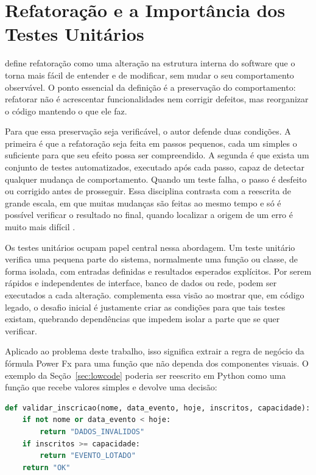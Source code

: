 \section{Refatoração e a Importância dos Testes Unitários}
\label{sec:refatoracao}

 define refatoração como uma alteração na estrutura interna do software que o torna mais fácil de entender e de modificar, sem mudar o seu comportamento observável. O ponto essencial da definição é a preservação do comportamento: refatorar não é acrescentar funcionalidades nem corrigir defeitos, mas reorganizar o código mantendo o que ele faz.

Para que essa preservação seja verificável, o autor defende duas condições. A primeira é que a refatoração seja feita em passos pequenos, cada um simples o suficiente para que seu efeito possa ser compreendido. A segunda é que exista um conjunto de testes automatizados, executado após cada passo, capaz de detectar qualquer mudança de comportamento. Quando um teste falha, o passo é desfeito ou corrigido antes de prosseguir. Essa disciplina contrasta com a reescrita de grande escala, em que muitas mudanças são feitas ao mesmo tempo e só é possível verificar o resultado no final, quando localizar a origem de um erro é muito mais difícil \cite{fowler2018refactoring}.

Os testes unitários ocupam papel central nessa abordagem. Um teste unitário verifica uma pequena parte do sistema, normalmente uma função ou classe, de forma isolada, com entradas definidas e resultados esperados explícitos. Por serem rápidos e independentes de interface, banco de dados ou rede, podem ser executados a cada alteração.  complementa essa visão ao mostrar que, em código legado, o desafio inicial é justamente criar as condições para que tais testes existam, quebrando dependências que impedem isolar a parte que se quer verificar.

Aplicado ao problema deste trabalho, isso significa extrair a regra de negócio da fórmula Power Fx para uma função que não dependa dos componentes visuais. O exemplo da Seção~\ref{sec:lowcode} poderia ser reescrito em Python como uma função que recebe valores simples e devolve uma decisão:

\begin{lstlisting}[language=Python,basicstyle=\ttfamily\small,frame=single,breaklines=true]
def validar_inscricao(nome, data_evento, hoje, inscritos, capacidade):
    if not nome or data_evento < hoje:
        return "DADOS_INVALIDOS"
    if inscritos >= capacidade:
        return "EVENTO_LOTADO"
    return "OK"
\end{lstlisting}


